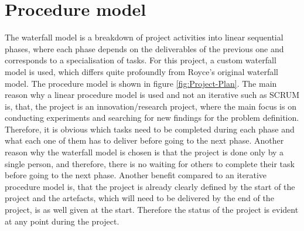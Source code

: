 \clearpage
{}

\section{Procedure model}
\label{sec:Procedure-Model}
The waterfall model is a breakdown of project activities into linear sequential phases, where each phase depends on the deliverables of the previous one and corresponds to a specialisation of tasks. For this project, a custom waterfall model is used, which differs quite profoundly from Royce's original waterfall model. The procedure model is shown in figure \ref{fig:Project-Plan}.
\newline
\newline
The main reason why a linear procedure model is used and not an iterative such as SCRUM is, that, the project is an innovation/research project, where the main focus is on conducting experiments and searching for new findings for the problem definition. Therefore, it is obvious which tasks need to be completed during each phase and what each one of them has to deliver before going to the next phase. Another reason why the waterfall model is chosen is that the project is done only by a single person, and therefore, there is no waiting for others to complete their task before going to the next phase. Another benefit compared to an iterative procedure model is, that the project is already clearly defined by the start of the project and the artefacts, which will need to be delivered by the end of the project, is as well given at the start. Therefore the status of the project is evident at any point during the project.

